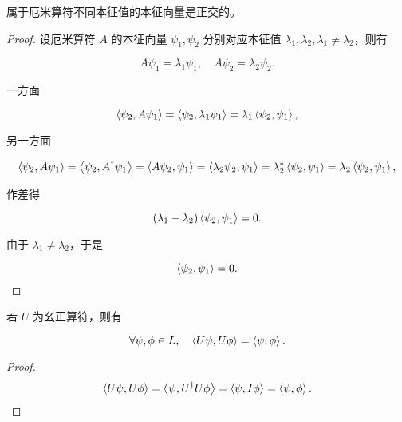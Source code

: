 \begin{theorem}
属于厄米算符不同本征值的本征向量是正交的。
\end{theorem}

\begin{proof}
    
设厄米算符 $A $ 的本征向量 $\psi_1,\psi_2 $ 分别对应本征值 $\lambda_1,\lambda_2,\lambda_1\ne\lambda_2 $，则有

\begin{equation}
A \psi_1 = \lambda_1 \psi_1,\quad
A \psi_2 = \lambda_2 \psi_2.
\end{equation}

一方面

\begin{equation}
\Braket{\psi_2 , A \psi_1}
=\Braket{\psi_2 , \lambda_1 \psi_1}
=\lambda_1 \Braket{\psi_2 , \psi_1},
\end{equation}

另一方面

\begin{equation}
\Braket{\psi_2 , A \psi_1}
=\Braket{\psi_2 , A^\dag \psi_1}
=\Braket{A \psi_2 , \psi_1}
=\Braket{\lambda_2 \psi_2 , \psi_1}
=\lambda_2^* \Braket{\psi_2 , \psi_1}
=\lambda_2 \Braket{\psi_2 , \psi_1},
\end{equation}

作差得

\begin{equation}
\left(\lambda_1 - \lambda_2 \right) \Braket{\psi_2 , \psi_1}
=0.
\end{equation}

由于 $\lambda_1 \ne \lambda_2 $，于是

\begin{equation}
\Braket{\psi_2 , \psi_1} = 0.
\end{equation}

\end{proof}

\begin{theorem}
若 $U $ 为幺正算符，则有

\begin{equation}
\forall \psi,\phi\in L,\quad
\Braket{U \psi , U\phi }
=\Braket{\psi , \phi } .
\end{equation}
\end{theorem}

\begin{proof}

\begin{equation}
\Braket{U \psi , U\phi }
=\Braket{\psi , U^\dag U\phi }
=\Braket{\psi , I\phi }
=\Braket{\psi , \phi }.
\end{equation}

\end{proof}

